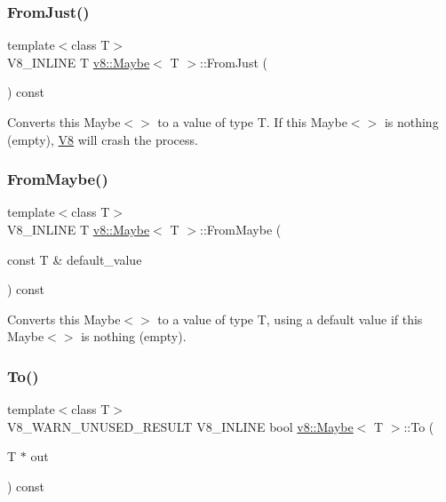 \subsubsection{\texorpdfstring{From\+Just()}{FromJust()}}
{\footnotesize\ttfamily template$<$class T$>$ \\
V8\+\_\+\+I\+N\+L\+I\+NE T \mbox{\hyperlink{classv8_1_1Maybe}{v8\+::\+Maybe}}$<$ T $>$\+::From\+Just (\begin{DoxyParamCaption}{ }\end{DoxyParamCaption}) const\hspace{0.3cm}{\ttfamily [inline]}}

Converts this Maybe$<$$>$ to a value of type T. If this Maybe$<$$>$ is nothing (empty), \mbox{\hyperlink{classv8_1_1V8}{V8}} will crash the process. \mbox{\label{classv8_1_1Maybe_a4b95361b73d9af3dddd975accca89a5f}} 
\subsubsection{\texorpdfstring{From\+Maybe()}{FromMaybe()}}
{\footnotesize\ttfamily template$<$class T$>$ \\
V8\+\_\+\+I\+N\+L\+I\+NE T \mbox{\hyperlink{classv8_1_1Maybe}{v8\+::\+Maybe}}$<$ T $>$\+::From\+Maybe (\begin{DoxyParamCaption}\item[{const T \&}]{default\+\_\+value }\end{DoxyParamCaption}) const\hspace{0.3cm}{\ttfamily [inline]}}

Converts this Maybe$<$$>$ to a value of type T, using a default value if this Maybe$<$$>$ is nothing (empty). \mbox{\label{classv8_1_1Maybe_a7d1d77e5fd55f125fb4c41db1335bd09}} 
\subsubsection{\texorpdfstring{To()}{To()}}
{\footnotesize\ttfamily template$<$class T$>$ \\
V8\+\_\+\+W\+A\+R\+N\+\_\+\+U\+N\+U\+S\+E\+D\+\_\+\+R\+E\+S\+U\+LT V8\+\_\+\+I\+N\+L\+I\+NE bool \mbox{\hyperlink{classv8_1_1Maybe}{v8\+::\+Maybe}}$<$ T $>$\+::To (\begin{DoxyParamCaption}\item[{T $\ast$}]{out }\end{DoxyParamCaption}) const\hspace{0.3cm}{\ttfamily [inline]}}

